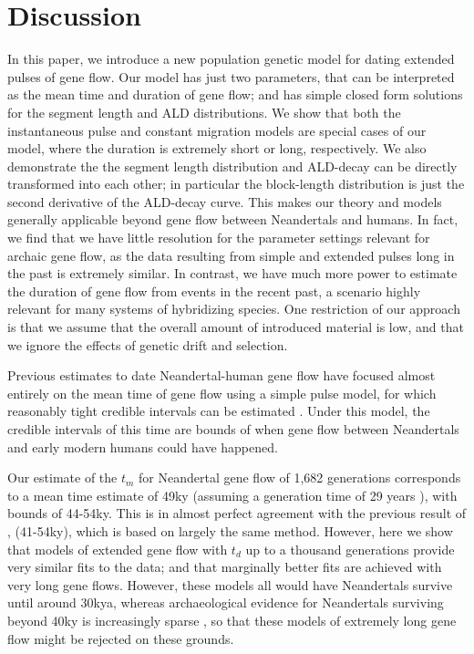 \documentclass[11pt]{article}
\begin{document}
\section{Discussion}\label{discussion}
In this paper, we introduce a new population genetic model for dating extended pulses of gene flow. Our model has  just two parameters, that can be interpreted as the mean time and duration of gene flow; and has simple closed form solutions for the segment length and ALD distributions. We show that both the instantaneous pulse and constant migration models are special cases of our model, where the duration is extremely short or long, respectively. We also demonstrate the the segment length distribution and ALD-decay can be directly transformed into each other; in particular the block-length distribution is just the second derivative of the ALD-decay curve. This makes our theory and models generally applicable beyond gene flow between Neandertals and humans. In fact, we find that we have little resolution for the parameter settings relevant for archaic gene flow, as the data resulting from simple and extended pulses long in the past is extremely similar. In contrast, we have much more power to estimate the duration of gene flow from events in the recent past, a scenario highly relevant for many systems of hybridizing species. One restriction of our approach is that we assume that the overall amount of introduced material is low, and that we ignore the effects of genetic drift and selection.

Previous estimates to date Neandertal-human gene flow have focused almost entirely on the mean time of gene flow using a simple pulse model, for which reasonably tight credible intervals can be estimated \citep{sankararaman_date_2012, moorjani_genetic_2016}. Under this model, the credible intervals of this time are bounds of when gene flow between Neandertals and early modern humans could have happened. 

Our estimate of the $t_m$ for Neandertal gene flow of 1,682 generations corresponds to a mean time estimate of 49ky (assuming a generation time of 29 years \cite{moorjani_genetic_2016}), with bounds of 44-54ky. This is in almost perfect agreement with the previous result of \citep{moorjani_genetic_2016}, (41-54ky), which is based on largely the same method. However, here we show that models of extended gene flow with $t_d$ up to a thousand generations provide very similar fits to the data; and that marginally better fits are achieved with very long gene flows. However, these models all would have Neandertals survive until around 30kya, whereas archaeological evidence for Neandertals surviving beyond 40ky is increasingly sparse \citep{hublin_last_2017}, so that these models of extremely long gene flow might be rejected on these grounds. 
\end{document}
